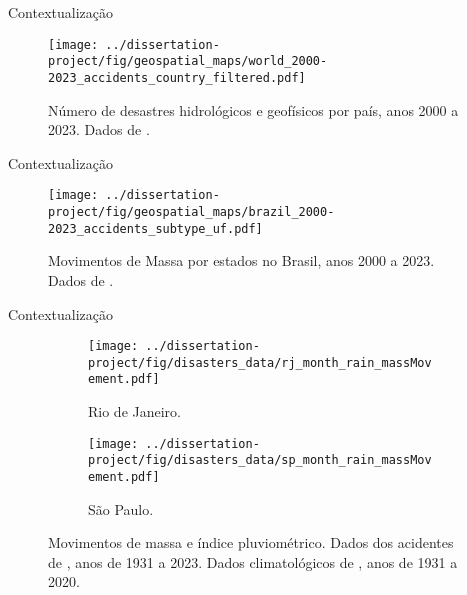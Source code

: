\begin{frame}{Contextualização}
    \begin{figure}
        \centering
        \texttt{[image: ../dissertation-project/fig/geospatial\_maps/world\_2000-2023\_accidents\_country\_filtered.pdf]}
        \caption{Número de desastres hidrológicos e geofísicos por país, anos 2000 a 2023. Dados de \cite{emdat_2023}.}
    \end{figure}
\end{frame}

\begin{frame}{Contextualização}
    \begin{figure}
        \centering
        \texttt{[image: ../dissertation-project/fig/geospatial\_maps/brazil\_2000-2023\_accidents\_subtype\_uf.pdf]}
        \caption{Movimentos de Massa por estados no Brasil, anos 2000 a 2023. Dados de \cite{emdat_2023}.}
    \end{figure}
\end{frame}

\begin{frame}{Contextualização}
    \begin{figure}
        \centering
        \begin{subfigure}{0.45\textwidth}
            \centering
            \texttt{[image: ../dissertation-project/fig/disasters\_data/rj\_month\_rain\_massMovement.pdf]}
            \caption{Rio de Janeiro.}
            \label{fig:rj}
        \end{subfigure}
        \hfill
        \begin{subfigure}{0.45\textwidth}
            \centering
            \texttt{[image: ../dissertation-project/fig/disasters\_data/sp\_month\_rain\_massMovement.pdf]}
            \caption{São Paulo.}
            \label{fig:sp}
        \end{subfigure}
        \caption{Movimentos de massa e índice pluviométrico. Dados dos acidentes de \cite{atlas_brazil_2023}, anos de 1931 a 2023. Dados climatológicos de \cite{ANA}, anos de 1931 a 2020.}
        \label{fig:test}
    \end{figure}
\end{frame}


